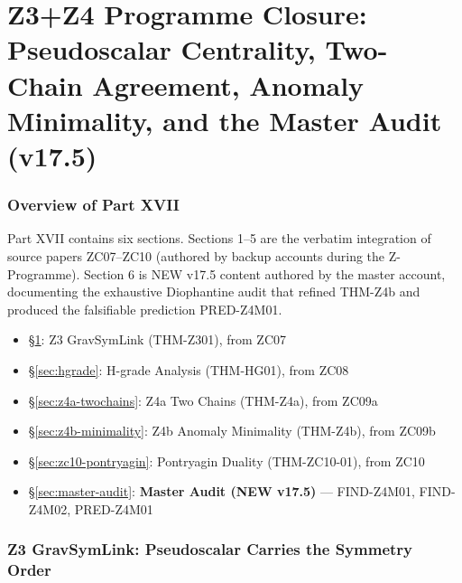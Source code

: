 \documentclass[12pt, a4paper]{article}
\begin{document}
\part{Z3+Z4 Programme Closure: Pseudoscalar Centrality, Two-Chain Agreement, Anomaly Minimality, and the Master Audit (v17.5)}
\label{part:XVII}

\section*{Overview of Part XVII}

Part XVII contains six sections. Sections 1--5 are the verbatim integration
of source papers ZC07--ZC10 (authored by backup accounts during the
Z-Programme). Section 6 is NEW v17.5 content authored by the master
account, documenting the exhaustive Diophantine audit that refined
THM-Z4b and produced the falsifiable prediction PRED-Z4M01.

\begin{itemize}[leftmargin=2em]
\item \S\ref{sec:z3-gravsym}: Z3 GravSymLink (THM-Z301), from ZC07
\item \S\ref{sec:hgrade}: H-grade Analysis (THM-HG01), from ZC08
\item \S\ref{sec:z4a-twochains}: Z4a Two Chains (THM-Z4a), from ZC09a
\item \S\ref{sec:z4b-minimality}: Z4b Anomaly Minimality (THM-Z4b), from ZC09b
\item \S\ref{sec:zc10-pontryagin}: Pontryagin Duality (THM-ZC10-01), from ZC10
\item \S\ref{sec:master-audit}: \textbf{Master Audit (NEW v17.5)} —
  FIND-Z4M01, FIND-Z4M02, PRED-Z4M01
\end{itemize}

\section{Z3 GravSymLink: Pseudoscalar Carries the Symmetry Order}
\label{sec:z3-gravsym}

\end{document}
